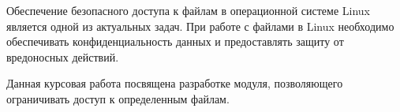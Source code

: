\Introduction

Обеспечение безопасного доступа к файлам в операционной системе Linux является одной из актуальных задач.  
При работе с файлами в Linux необходимо обеспечивать конфиденциальность данных и предоставлять защиту от вредоносных действий.

Данная курсовая работа посвящена разработке модуля, позволяющего ограничивать доступ к определенным файлам.